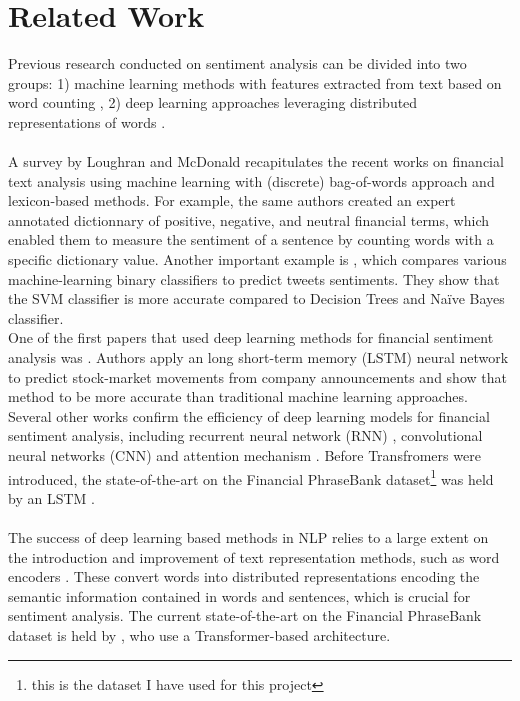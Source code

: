 \documentclass[final]{cvpr}
\begin{document}
\section{Related Work}

Previous research conducted on sentiment analysis can be divided into two groups: 1) machine learning methods with features extracted from text based on word counting \cite{ml-1, ml-2, tfidf}, 2) deep learning approaches leveraging distributed representations of words \cite{dl-1, dl-2, dl-3}.\\
\\
A survey by Loughran and McDonald \cite{loughran} recapitulates the recent works on financial text analysis using machine learning with (discrete) bag-of-words approach and lexicon-based methods. For example, the same authors created an expert annotated dictionnary of positive, negative, and neutral financial terms, which enabled them to measure the sentiment of a sentence by counting words with a specific dictionary value. Another important example is \cite{naivebayes}, which compares various machine-learning binary classifiers to predict tweets sentiments. They show that the SVM classifier is more accurate compared to Decision Trees and Naïve Bayes classifier.\\
\noindent
One of the first papers that used deep learning methods for financial sentiment analysis was \cite{kraus}. Authors apply an long short-term memory (LSTM) neural network to predict stock-market movements from company announcements and show that method to be more accurate than traditional machine learning approaches. Several other works confirm the efficiency of deep learning models for financial sentiment analysis, including recurrent neural network (RNN) \cite{rnn-1, rnn-2}, convolutional neural networks (CNN) \cite{cnn-1, cnn-2} and attention mechanism \cite{att-1}. Before Transfromers were introduced, the state-of-the-art on the Financial PhraseBank dataset\footnote{this is the dataset I have used for this project} was held by an LSTM \cite{sota_lstm}.\\
\\
The success of deep learning based methods in NLP relies to a large extent on the introduction and improvement of text representation methods, such as word encoders \cite{word2vec, glove, elmo}. These convert words into distributed representations encoding the semantic information contained in words and sentences, which is crucial for sentiment analysis. The current state-of-the-art on the Financial PhraseBank dataset is held by \cite{FinBERT}, who use a Transformer-based architecture.
\end{document}
